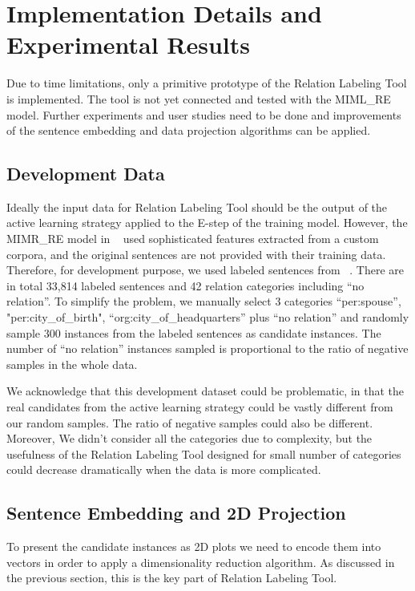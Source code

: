 \documentclass[11pt,a4paper]{article}
\begin{document}
	\section{Implementation Details and Experimental Results}
	
	Due to time limitations, only a primitive prototype of the Relation Labeling Tool is implemented. The tool is not yet connected and tested with the MIML\_RE model. Further experiments and user studies need to be done and improvements of the sentence embedding and data projection algorithms can be applied.
	
	\subsection{Development Data}
	Ideally the input data for Relation Labeling Tool should be the output of the active learning strategy applied to the E-step of the training model. However, the MIMR\_RE model in ~\citet{surdeanu2012multi} used sophisticated features extracted from a custom corpora, and the original sentences are not provided with their training data. Therefore, for development purpose, we used labeled sentences from ~\citet{angeli2014combining}. There are in total 33,814 labeled sentences and 42 relation categories including ``no relation''. To simplify the problem, we manually select 3 categories ``per:spouse'', "per:city\_of\_birth", ``org:city\_of\_headquarters'' plus ``no relation'' and randomly sample 300 instances from the labeled sentences as candidate instances. The number of ``no relation'' instances sampled is proportional to the ratio of negative samples in the whole data.
	
	We acknowledge that this development dataset could be problematic, in that the real candidates from the active learning strategy could be vastly different from our random samples. The ratio of negative samples could also be different. Moreover, We didn't consider all the categories due to complexity, but the usefulness of the Relation Labeling Tool designed for small number of categories could decrease dramatically when the data is more complicated.
	
	\subsection{Sentence Embedding and 2D Projection}
	To present the candidate instances as 2D plots we need to encode them into vectors in order to apply a dimensionality reduction algorithm. As discussed in the previous section, this is the key part of Relation Labeling Tool. 
	
\end{document}
